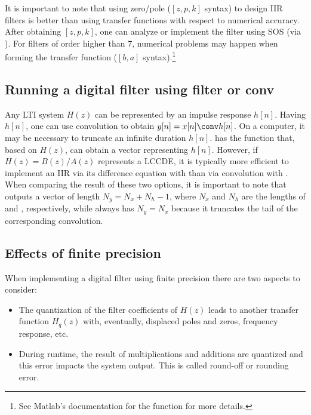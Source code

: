 It is important to note that using zero/pole ($[z,p,k]$ syntax) to design IIR filters is better than using transfer functions with respect to numerical accuracy. After obtaining $[z,p,k]$, one can analyze or implement the filter using SOS (via ). For filters of order higher than 7, numerical problems may happen when forming the transfer function ($[b,a]$ syntax).\footnote{See Matlab's documentation for the  function for more details.}

\subsection{Running a digital filter using filter or conv}
\label{subsec:compensating_filtering}

Any LTI system $H(z)$ can be represented by an impulse response $h[n]$. Having $h[n]$, one can use convolution to obtain $y[n] = x[n] \conv h[n]$. On a computer, it may be necessary to truncate an infinite duration $h[n]$. {\matlab} has the function  that, based on $H(z)$, can obtain a vector  representing $h[n]$. However, if $H(z)=B(z)/A(z)$ represents a LCCDE, it is typically more efficient to implement an IIR via its difference equation with  than via convolution with . When comparing the result of these two options, it is important to note that  outputs a vector of length $N_y = N_x + N_h -1$, where $N_x$ and $N_h$ are the lengths of  and , respectively, while  always has $N_y=N_x$ because it truncates the tail of the corresponding convolution.

\subsection{{\akadvanced} Effects of finite precision}

When implementing a digital filter using finite precision there are two aspects to consider:
\begin{itemize}
	\item The quantization of the filter coefficients of $H(z)$ leads to another transfer function $H_q(z)$ with, eventually, displaced poles and zeros, frequency response, etc.
	\item During runtime, the result of multiplications and additions are quantized and this error impacts the system output. This is called round-off or rounding error.
\end{itemize}

